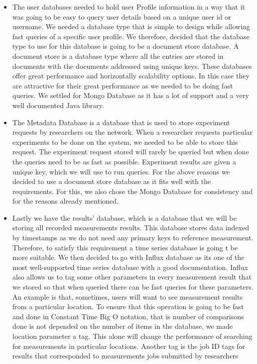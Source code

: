 \begin{itemize}
    \item The user databases needed to hold user Profile information in a way that it was going to be easy to query user details based on a unique user id or username.
    We needed a database type that is simple to design while allowing fast queries of a specific user profile.
    We therefore, decided that the database type to use for this database is going to be a document store database.
    A document store is a database type where all the entries are stored in documents with the documents addressed using unique keys\cite{nosql_dbs}.
    These databases offer great performance and horizontally scalability options\cite{nosql_dbs}.
    In this case they are attractive for their great performance as we needed to be doing fast queries.
    We settled for Mongo Database as it has a lot of support and a very well documented Java library.
    \item The Metadata Database is a database that is used to store experiment requests by researchers on the network.
    When a researcher requests particular experiments to be done on the system, we needed to be able to store this request.
    The experiment request stored will rarely be queried but when done the queries need to be as fast as possible.
    Experiment results are given a unique key, which we will use to run queries.
    For the above reasons we decided to use a document store database as it fits well with the requirements.
    For this, we also chose the Mongo Database for consistency and for the reasons already mentioned.
    \item Lastly we have the results' database, which is a database that we will be storing all recorded measurements results.
    This database stores data indexed by timestamps as we do not need any primary keys to reference measurement.
    Therefore, to satisfy this requirement a time series database is going t be more suitable.
    We then decided to go with Influx database as its one of the most well-supported time series database with a good documentation.
    Influx also allows us to tag some other parameters in every measurement result that we stored so that when queried there can be fast queries for these parameters.
    An example is that, sometimes, users will want to see measurement results from a particular location.
    To ensure that this operation is going to be fast and done in Constant Time Big O notation, that is number of comparisons done is not depended on the number of items in the database, we made location parameter a tag.
    This alone will change the performance of searching for measurements in particular locations.
    Another tag is the job ID tags for results that corresponded to measurements jobs submitted by researchers
\end{itemize}
